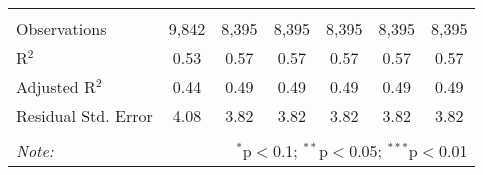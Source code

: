 \begin{table}[!htbp]
\begin{tabular}{@{\extracolsep{5pt}}lcccccc}
  & & & & & & \\ 
\hline \\[-1.8ex] 
Observations & 9,842 & 8,395 & 8,395 & 8,395 & 8,395 & 8,395 \\ 
R$^{2}$ & 0.53 & 0.57 & 0.57 & 0.57 & 0.57 & 0.57 \\ 
Adjusted R$^{2}$ & 0.44 & 0.49 & 0.49 & 0.49 & 0.49 & 0.49 \\ 
Residual Std. Error & 4.08 & 3.82 & 3.82 & 3.82 & 3.82 & 3.82 \\ 
\hline 
\hline \\[-1.8ex] 
\textit{Note:}  & \multicolumn{6}{r}{$^{*}$p$<$0.1; $^{**}$p$<$0.05; $^{***}$p$<$0.01} \\ 
\end{tabular} 
\end{table} 
